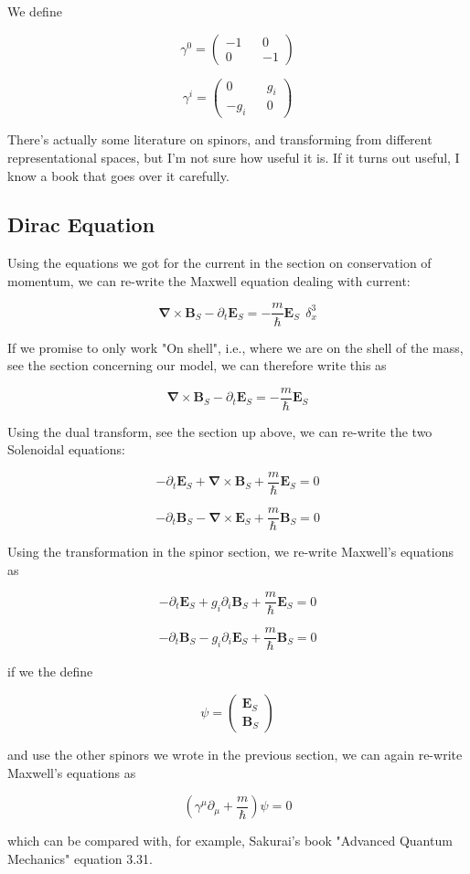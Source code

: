 \documentclass {article}
\renewcommand\vec{\mathbf}
\let\OldS\nabla
\renewcommand{\nabla}{\boldsymbol{\OldS}}
\begin{document}
We  define 

$$\gamma^0 = \left(\begin{matrix}  -1 && 0 \\ 0 && -1 \end{matrix}\right)$$

$$\gamma^i = \left(\begin{matrix}  0 && g_i \\ -g_i && 0 \end{matrix}\right)$$

There's actually some literature on spinors, and transforming from different representational spaces, but I'm not sure how useful it is. If it turns out useful, I know a book that goes over it carefully. 

\newpage

\subsection{Dirac Equation}

Using the equations we got for the current in the section on conservation of momentum, we can re-write the Maxwell equation dealing with current:

$$\nabla \times \vec B_S  - \partial_t \vec E_S  = - \frac m {\hbar} \vec E_S ~~ \delta^3_x$$

If we promise to only work "On shell", i.e., where we are on the shell of the mass, see the section concerning our model, we can therefore write this as

$$\nabla \times \vec B_S  - \partial_t \vec E_S  = - \frac m {\hbar} \vec E_S $$

Using the dual transform, see the section up above, we can re-write the two Solenoidal equations:

$$-\partial_t \vec E_S + \nabla \times \vec B_S   +\frac m {\hbar} \vec E_S = 0 $$ 

$$ -\partial_t \vec B_S - \nabla \times \vec E_S   +\frac m {\hbar} \vec B_S = 0$$ 


Using the transformation in the spinor section, we  re-write Maxwell's equations as 

$$-\partial_t \vec E_S + g_i \partial_i \vec B_S   +\frac m {\hbar} \vec E_S = 0 $$ 

$$ -\partial_t \vec B_S - g_i \partial_i \vec E_S   +\frac m {\hbar} \vec B_S = 0 $$ 


if we the define 

$$\psi = \left(\begin{matrix}  \vec E_S \\ \vec B_S \end{matrix}\right) $$

and use the other spinors we wrote in the previous section, we can again re-write Maxwell's equations as

$$\left(\gamma^{\mu} \partial_{\mu} + \frac m {\hbar} \right) \psi = 0 $$

which can be compared with, for example, Sakurai's book "Advanced Quantum Mechanics" equation 3.31.

\newpage
\end{document}

